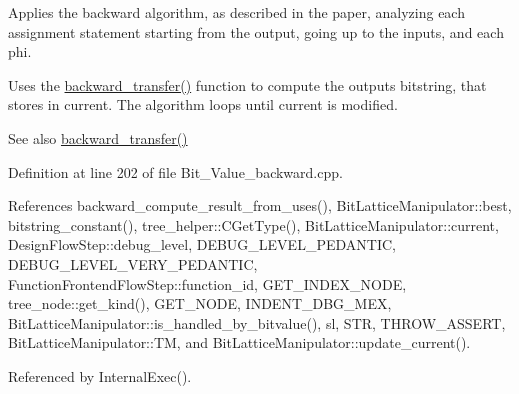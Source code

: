 Applies the backward algorithm, as described in the paper, analyzing each assignment statement starting from the output, going up to the inputs, and each phi. 

Uses the \hyperlink{classBit__Value_aec80afe9154981787b03d1a8c48df061}{backward\+\_\+transfer()} function to compute the output\textquotesingle{}s bitstring, that stores in current. The algorithm loops until current is modified. \begin{DoxySeeAlso}{See also}
\hyperlink{classBit__Value_aec80afe9154981787b03d1a8c48df061}{backward\+\_\+transfer()} 
\end{DoxySeeAlso}


Definition at line 202 of file Bit\+\_\+\+Value\+\_\+backward.\+cpp.



References backward\+\_\+compute\+\_\+result\+\_\+from\+\_\+uses(), Bit\+Lattice\+Manipulator\+::best, bitstring\+\_\+constant(), tree\+\_\+helper\+::\+C\+Get\+Type(), Bit\+Lattice\+Manipulator\+::current, Design\+Flow\+Step\+::debug\+\_\+level, D\+E\+B\+U\+G\+\_\+\+L\+E\+V\+E\+L\+\_\+\+P\+E\+D\+A\+N\+T\+IC, D\+E\+B\+U\+G\+\_\+\+L\+E\+V\+E\+L\+\_\+\+V\+E\+R\+Y\+\_\+\+P\+E\+D\+A\+N\+T\+IC, Function\+Frontend\+Flow\+Step\+::function\+\_\+id, G\+E\+T\+\_\+\+I\+N\+D\+E\+X\+\_\+\+N\+O\+DE, tree\+\_\+node\+::get\+\_\+kind(), G\+E\+T\+\_\+\+N\+O\+DE, I\+N\+D\+E\+N\+T\+\_\+\+D\+B\+G\+\_\+\+M\+EX, Bit\+Lattice\+Manipulator\+::is\+\_\+handled\+\_\+by\+\_\+bitvalue(), sl, S\+TR, T\+H\+R\+O\+W\+\_\+\+A\+S\+S\+E\+RT, Bit\+Lattice\+Manipulator\+::\+TM, and Bit\+Lattice\+Manipulator\+::update\+\_\+current().



Referenced by Internal\+Exec().

